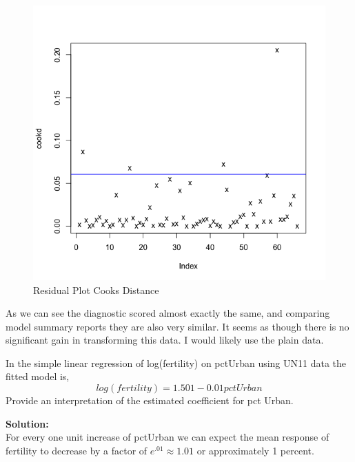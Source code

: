 \documentclass[12pt]{article}
\makeatletter
\theoremstyle{homework}
\newenvironment{exercise}[1]
{\def\@currentlabel{#1}\exercisecore}
{\endexercisecore}
\newcommand{\localhead}[1]{\par\smallskip\noindent\textbf{#1}\nobreak\\}%
\newcommand\solution{\localhead{Solution:}}
\makeatother
\begin{document}
\begin{exercise}{10.4}
\begin{figure}[H]
\begin{center}
    \end{center}
  \end{figure}
  \begin{figure}[H]
    \begin{center}
    \caption{Residual Plot Cooks Distance}
    \includegraphics[width = \textwidth]{InfluencePredTrans.png}
    \end{center}
  \end{figure}
  As we can see the diagnostic scored almost exactly the same, and comparing model summary reports they are also very similar.
  It seems as though there is no significant gain in transforming this data. I would likely use the plain data.   
\end{exercise}
\newpage


\begin{exercise}{4.6} In the simple linear regression of log(fertility) on pctUrban using UN11 data the fitted model is, 
  \begin{equation*}
    log(fertility) = 1.501 - 0.01pctUrban
  \end{equation*}
  Provide an interpretation of the estimated coefficient for pct Urban. \\
  \solution  For every one unit increase of pctUrban we can expect the mean response of fertility to decrease by a factor of
  $e^{.01} \approx 1.01$ or approximately 1 percent. 
  \end{exercise}
\end{document}
